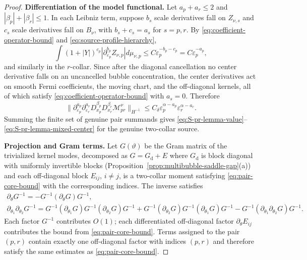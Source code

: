 \documentclass[11pt,reqno,a4paper]{amsart}
\numberwithin{equation}{section}
\theoremstyle{plain}
\theoremstyle{remark}
\theoremstyle{plain}
\begin{document}
\begin{proof}
\smallskip\noindent
\textbf{Differentiation of the model functional.}
Let $a_p+a_r\le2$ and $|\beta_p|+|\beta_r|\le1$.  In each Leibniz term, suppose $b_s$ scale derivatives fall on
$Z_{\nu,s}$ and $c_s$ scale derivatives fall on $B_\nu$, with $b_s+c_s=a_s$ for $s=p,r$.  By
\eqref{eq:coefficient-operator-bound} and \eqref{eq:source-profile-hierarchy},
\[
\int(1+|Y|)^{c_p}|\partial_{\varepsilon_p}^{b_p}Z_{\nu,p}|d\mu_{\nu,p}
\le C\varepsilon_p^{-b_p-c_p}=C\varepsilon_p^{-a_p},
\]
and similarly in the $r$-collar.  Since after the diagonal cancellation no center derivative falls on an
uncancelled bubble concentration, the center derivatives act on smooth Fermi coefficients, the moving chart,
and the off-diagonal kernels, all of which satisfy \eqref{eq:coefficient-operator-bound} with $a_s=0$.
Therefore
\begin{equation}\label{eq:pair-core-bound}
\big\|
\partial_{\varepsilon_p}^{a_p}\partial_{\varepsilon_r}^{a_r}
D_{x_p}^{\beta_p}D_{x_r}^{\beta_r}\mathcal M_{pr}^\nu
\big\|_{H^{-1}}
\le C_\delta\varepsilon_p^{\alpha-a_p}\varepsilon_r^{\alpha-a_r}.
\end{equation}
Summing the finite set of genuine pair summands gives
\eqref{eq:S-pr-lemma-value}--\eqref{eq:S-pr-lemma-mixed-center} for the genuine two-collar source.

\smallskip\noindent
\textbf{Projection and Gram terms.}
Let $G(\vartheta)$ be the Gram matrix of the trivialized kernel modes, decomposed as
$G=G_{\mathrm{d}}+E$ where $G_{\mathrm{d}}$ is block diagonal with uniformly invertible blocks
(Proposition~\ref{prop:multibubble-saddle-gap}\textup{(a)}) and each off-diagonal block $E_{ij}$, $i\ne j$, is a
two-collar moment satisfying \eqref{eq:pair-core-bound} with the corresponding indices.  The inverse satisfies
\begin{gather}
\partial_\theta G^{-1}=-G^{-1}(\partial_\theta G)G^{-1},
\label{eq:Ginv-first}\\
\partial_{\theta_1}\partial_{\theta_2}G^{-1}
=G^{-1}(\partial_{\theta_1}G)G^{-1}(\partial_{\theta_2}G)G^{-1}
+G^{-1}(\partial_{\theta_2}G)G^{-1}(\partial_{\theta_1}G)G^{-1}
-G^{-1}(\partial_{\theta_1}\partial_{\theta_2}G)G^{-1}.
\label{eq:Ginv-second}
\end{gather}
Each factor $G^{-1}$ contributes $O(1)$; each differentiated off-diagonal factor
$\partial_\theta E_{ij}$ contributes the bound from \eqref{eq:pair-core-bound}.  Terms assigned to the pair
$(p,r)$ contain exactly one off-diagonal factor with indices $(p,r)$ and therefore satisfy the same estimates as
\eqref{eq:pair-core-bound}.


\end{proof}
\end{document}
